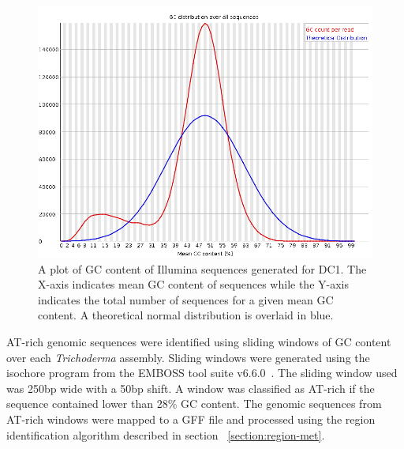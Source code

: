 \begin{figure}
  \centering
  \includegraphics[width=\textwidth]{figures/dc1-low-gc-fastqc.png}
  \caption[GC content distribution for DC1]{A plot of GC content of Illumina sequences generated for
    DC1. The X-axis indicates mean GC content of sequences while the
    Y-axis indicates the total number of sequences for a given mean GC
    content. A theoretical normal distribution is overlaid in blue.}
  \label{fig:dc1-low-gc}
\end{figure}

AT-rich genomic sequences were identified using sliding windows of GC
content over each \textit{Trichoderma} assembly. Sliding windows were
generated using the isochore program from the EMBOSS tool suite
v6.6.0~\cite{rice2000a}. The sliding window used was 250bp wide with a
50bp shift. A window was classified as AT-rich if the sequence
contained lower than 28\% GC content. The genomic sequences from
AT-rich windows were mapped to a GFF file and processed using the
region identification algorithm described in section
~\ref{section:region-met}.



